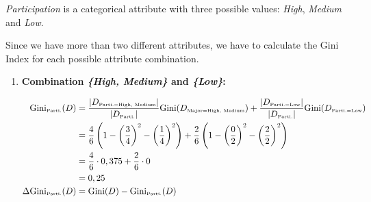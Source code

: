 \documentclass[
english,
smallborders
]{i6prcsht}
\newcommand{\OfSpecificValue}[3]{_{\text{\tiny #1#2#3}}}
\newcommand{\OfAttribute}[1]{_{\text{\tiny #1}}}
\begin{document}
\begin{solution}
\begin{enumerate}
\begin{enumerate}
\begin{enumerate}
				                  \textit{Participation} is a categorical attribute with three possible values: \textit{High}, \textit{Medium} and \textit{Low}.
				                  
				                  Since we have more than two different attributes, we have to calculate the Gini Index for each possible attribute combination.
				                  
				                  \begin{enumerate}	
					                  \item \textbf{Combination \textit{\{High, Medium\}} and \textit{\{Low\}}:}
					                        
					                        \begin{alignat*}{2}
						                        \text{Gini}\OfAttribute{Parti.}(D)       & = \frac{|D\OfSpecificValue{Parti.}{=}{High, Medium}|}{|D\OfAttribute{Parti.}|} \text{Gini}(D\OfSpecificValue{Major}{=}{High, Medium}) + \frac{|D\OfSpecificValue{Parti.}{=}{Low}|}{|D\OfAttribute{Parti.}|} \text{Gini}(D\OfSpecificValue{Parti.}{=}{Low}) \\
						                                                                 & = \frac{4}{6} \left(1 - \left(\frac{3}{4}\right)^2 - \left(\frac{1}{4}\right)^2\right) + \frac{2}{6} \left(1 - \left(\frac{0}{2}\right)^2 - \left(\frac{2}{2}\right)^2\right)                                                                              \\
						                                                                 & = \frac{4}{6} \cdot 0,375 + \frac{2}{6} \cdot 0                                                                                                                                                                                                            \\
						                                                                 & = 0,25                                                                                                                                                                                                                                                     \\
						                        \Delta\text{Gini}\OfAttribute{Parti.}(D) & = \text{Gini}(D) - \text{Gini}\OfAttribute{Parti.}(D)                                                                                                                                                                                                      \\

\end{alignat*}
\end{enumerate}
\end{enumerate}
\end{enumerate}
\end{enumerate}
\end{solution}
\end{document}
